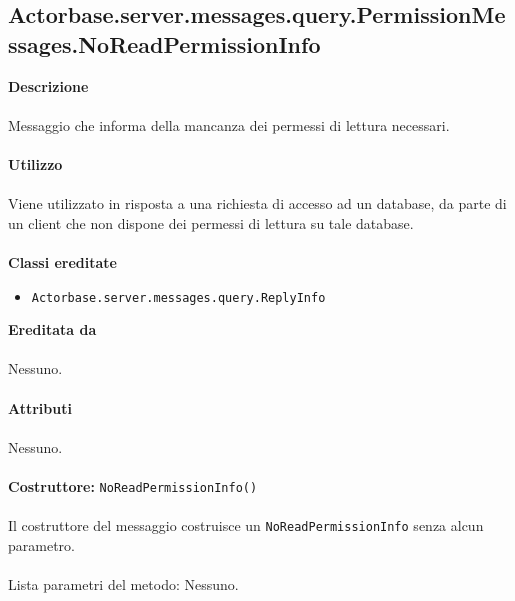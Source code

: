 \documentclass[a4paper]{article}
\begin{document}
\subsection{Actorbase.server.messages.query.PermissionMessages.NoReadPermissionInfo}
		\textbf{Descrizione}
			\\ \\
			Messaggio che informa della mancanza dei permessi di lettura necessari.
			\\ \\
		\textbf{Utilizzo}
			\\ \\
			Viene utilizzato in risposta a una richiesta di accesso ad un database, da parte di un client che non dispone dei permessi di lettura su tale database.
			\\ \\
		\textbf{Classi ereditate}
			\begin{itemize}
				\item \texttt{Actorbase.server.messages.query.ReplyInfo}
			\end{itemize}
		\textbf{Ereditata da}
			\\ \\
			Nessuno.
			\\ \\
		\textbf{Attributi}
			\\ \\
			Nessuno.
			\\ \\
		\textbf{Costruttore: } \texttt{NoReadPermissionInfo()}
			\\ \\
			Il costruttore del messaggio costruisce un \texttt{NoReadPermissionInfo} senza alcun parametro.
			\\ \\
			Lista parametri del metodo: Nessuno.
						
\end{document}
